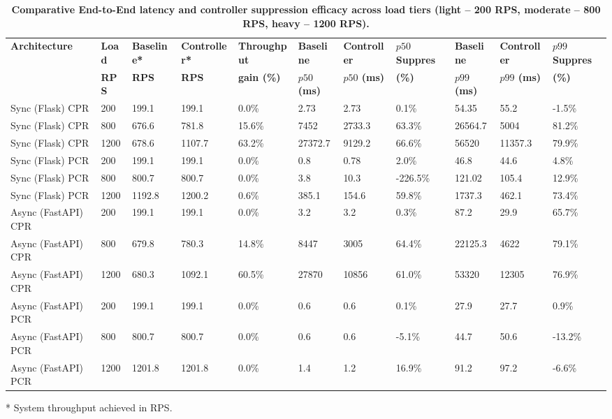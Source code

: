 \documentclass{ieeeaccess}
\begin{document}
\begin{table}[htbp]
	\centering
	\caption{\textbf{Comparative End-to-End latency and controller suppression efficacy across load tiers (light -- 200 RPS, moderate -- 800 RPS, heavy -- 1200 RPS).}}
	\label{tab:compare-analysis}
	\setlength{\tabcolsep}{3pt}
	\begin{tabular}{lllllllllll}
		\hline
		\textbf{Architecture}& \textbf{Load}& \textbf{Baseline*}& \textbf{Controller*}& \textbf{Throughput}& \textbf{Baseline}& \textbf{Controller}& \textbf{{$p50$} Suppres}& \textbf{Baseline}& \textbf{Controller}& \textbf{{$p99$} Suppres}\\
		& \textbf{RPS}& \textbf{RPS}& \textbf{RPS}& \textbf{gain (\%)}& \textbf{{$p50$} (ms)}& \textbf{{$p50$} (ms)}& \textbf{(\%)}& \textbf{{$p99$} (ms)}& \textbf{{$p99$} (ms)}& \textbf{(\%)}\\
		\hline
		Sync (Flask) CPR & 200  & 199.1  & 199.1   & 0.0\%  & 2.73     & 2.73    & 0.1\%    & 54.35    & 55.2    & -1.5\%\\
		Sync (Flask) CPR & 800  & 676.6  & 781.8   & 15.6\% & 7452     & 2733.3  & 63.3\%   & 26564.7  & 5004    & 81.2\%\\
		Sync (Flask) CPR & 1200 & 678.6  & 1107.7  & 63.2\% & 27372.7  & 9129.2  & 66.6\%   & 56520    & 11357.3 & 79.9\%\\
		\hline
		Sync (Flask) PCR & 200  & 199.1   & 199.1  & 0.0\%  & 0.8    & 0.78    & 2.0\%    & 46.8     & 44.6    & 4.8\%\\
		Sync (Flask) PCR & 800  & 800.7   & 800.7  & 0.0\%  & 3.8    & 10.3    & -226.5\% & 121.02   & 105.4   & 12.9\%\\
		Sync (Flask) PCR & 1200 & 1192.8 & 1200.2  & 0.6\%  & 385.1  & 154.6   & 59.8\%   & 1737.3   & 462.1   & 73.4\%\\
		\hline
		Async (FastAPI) CPR & 200  & 199.1  & 199.1  & 0.0\%  & 3.2   & 3.2   & 0.3\%  & 87.2     & 29.9   & 65.7\% \\
		Async (FastAPI) CPR & 800  & 679.8  & 780.3  & 14.8\% & 8447  & 3005  & 64.4\% & 22125.3  & 4622   & 79.1\% \\
		Async (FastAPI) CPR & 1200 & 680.3  & 1092.1 & 60.5\% & 27870 & 10856 & 61.0\% & 53320    & 12305  & 76.9\% \\
		\hline
		Async (FastAPI) PCR & 200  & 199.1  & 199.1  & 0.0\%  & 0.6   & 0.6   & 0.1\%  & 27.9   & 27.7 & 0.9\% \\
		Async (FastAPI) PCR & 800  & 800.7  & 800.7  & 0.0\%  & 0.6   & 0.6   & -5.1\% & 44.7   & 50.6 & -13.2\% \\
		Async (FastAPI) PCR & 1200 & 1201.8 & 1201.8 & 0.0\%  & 1.4   & 1.2   & 16.9\% & 91.2   & 97.2 & -6.6\% \\
		\hline
	\end{tabular}
	\begin{flushleft}
		\small{* System throughput achieved in RPS.}
	\end{flushleft}
\end{table}
\end{document}
